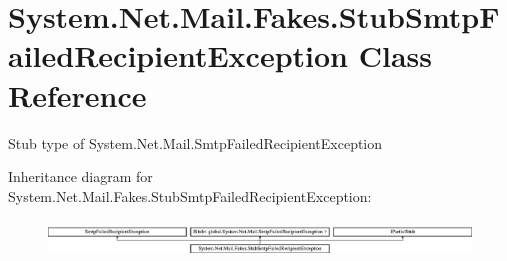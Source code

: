 \hypertarget{class_system_1_1_net_1_1_mail_1_1_fakes_1_1_stub_smtp_failed_recipient_exception}{\section{System.\-Net.\-Mail.\-Fakes.\-Stub\-Smtp\-Failed\-Recipient\-Exception Class Reference}
\label{class_system_1_1_net_1_1_mail_1_1_fakes_1_1_stub_smtp_failed_recipient_exception}
}


Stub type of System.\-Net.\-Mail.\-Smtp\-Failed\-Recipient\-Exception 


Inheritance diagram for System.\-Net.\-Mail.\-Fakes.\-Stub\-Smtp\-Failed\-Recipient\-Exception\-:\begin{figure}[H]
\begin{center}
\leavevmode
\includegraphics[height=0.998218cm]{class_system_1_1_net_1_1_mail_1_1_fakes_1_1_stub_smtp_failed_recipient_exception}
\end{center}
\end{figure}
